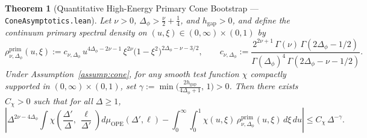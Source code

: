 \documentclass[10pt,a4paper]{article}
\newtheorem{theorem}{Theorem}
\theoremstyle{definition}
\begin{document}
\begin{theorem}[Quantitative High-Energy Primary Cone Bootstrap --- \texttt{ConeAsymptotics.lean}]
\label{thm:cone-bootstrap}
Let $\nu > 0$, $\Delta_\phi > \frac{\nu}{2} + \frac{1}{4}$, and $h_{\mathrm{gap}} > 0$, and define the continuum primary spectral density on $(u, \xi) \in (0, \infty) \times (0, 1)$ by
\begin{equation}
  \rho^{\mathrm{prim}}_{\nu, \Delta_\phi}(u, \xi) := c_{\nu, \Delta_\phi} \, u^{4\Delta_\phi - 2\nu - 1} \, \xi^{2\nu} \bigl(1 - \xi^2\bigr)^{2\Delta_\phi - \nu - 3/2}, \qquad
  c_{\nu, \Delta_\phi} := \frac{2^{2\nu + 1} \, \Gamma(\nu) \, \Gamma(2\Delta_\phi - 1/2)}{\Gamma(\Delta_\phi)^4 \, \Gamma(2\Delta_\phi - \nu - 1/2)}.
\end{equation}
Under Assumption~\ref{assump:cone}, for any smooth test function $\chi$ compactly supported in $(0, \infty) \times (0, 1)$, set $\gamma := \min\bigl(\frac{2 h_{\mathrm{gap}}}{4\Delta_\phi + 1},\, 1\bigr) > 0$. Then there exists $C_\chi > 0$ such that for all $\Delta \ge 1$,
\begin{equation}
  \label{eq:cone-bootstrap}
  \left|\Delta^{2\nu - 4\Delta_\phi} \int \chi\!\left(\frac{\Delta'}{\Delta},\, \frac{\ell}{\Delta'}\right) d\mu_{\mathrm{OPE}}(\Delta', \ell)
    - \int_0^\infty \int_0^1 \chi(u, \xi) \, \rho^{\mathrm{prim}}_{\nu, \Delta_\phi}(u, \xi) \, d\xi \, du\right|
  \le C_\chi \, \Delta^{-\gamma}.
\end{equation}
\end{theorem}
\end{document}

